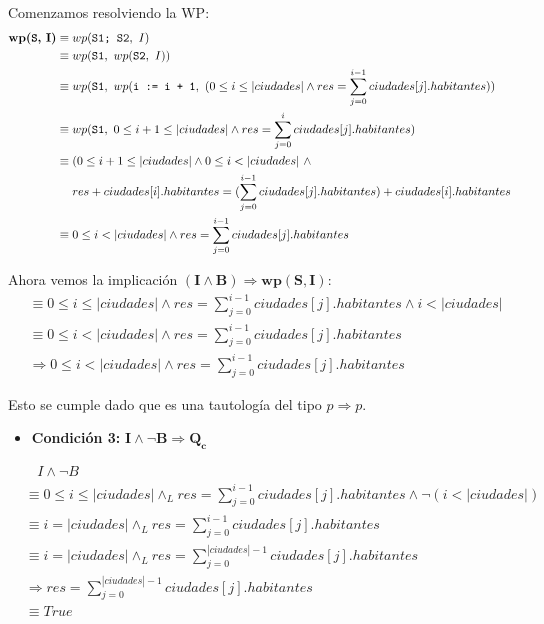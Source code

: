 \documentclass[10pt,a4paper]{article}
\begin{document}
Comenzamos resolviendo la WP:
    \setcounter{equation}{0}
        \begin{align}
                \textbf{wp(\texttt{S}, I)} &\equiv wp(\texttt{S1; S2}, \ I) \\
                &\equiv wp(\texttt{S1}, \ wp(\texttt{S2}, \ I)) \\
                &\equiv wp(\texttt{S1}, \ wp(\texttt{i := i + 1}, \ (0 \leq i \leq |ciudades| \land res = \sum\limits_{j = 0}^{i - 1} ciudades[j].habitantes)) \\
                &\equiv wp(\texttt{S1}, \ 0 \leq i + 1 \leq |ciudades| \land res = \sum\limits_{j = 0}^{i} ciudades[j].habitantes) \\
                &\equiv (0 \leq i + 1 \leq |ciudades| \land 0\leq i < |ciudades| \ \land \\
                & \ \ \ \ res + ciudades[i].habitantes = (\sum\limits_{j = 0}^{i - 1} ciudades[j].habitantes) + ciudades[i].habitantes \\
                &\equiv 0 \leq i < |ciudades| \land res = \sum\limits_{j = 0}^{i - 1} ciudades[j].habitantes
        \end{align}

Ahora vemos la implicación $\mathbf{(I\land B) \Rightarrow wp(\textbf{S},I)}$:
    \setcounter{equation}{0}
    \begin{align}
               & \equiv 0 \leq i \leq |ciudades| \land res = \sum\limits_{j = 0} ^ {i - 1} ciudades[j].habitantes \land i < |ciudades| \\
               & \equiv 0 \leq i < |ciudades| \land res = \sum\limits_{j = 0} ^ {i - 1} ciudades[j].habitantes \\
               \nonumber & \Rightarrow 0 \leq i < |ciudades| \land res =\sum\limits_{j=0} ^ {i-1} ciudades[j].habitantes 
    \end{align}

Esto se cumple dado que es una tautología del tipo $p \Rightarrow p$. \\


\begin{itemize}
    \item{\textbf{Condición 3:} $\mathbf{I \land \lnot B \Rightarrow Q_c}$}
\end{itemize}

\setcounter{equation}{0}
\begin{align}
        \nonumber & \ \ \ \ I \land \lnot B \\ 
        & \equiv 0 \leq i \leq |ciudades| \land_L res = \sum_{j = 0}^{i - 1} ciudades[j].habitantes \land \lnot (i < |ciudades|) \\
        & \equiv i = |ciudades| \land_L res = \sum_{j = 0}^{i - 1} ciudades[j].habitantes \\
        & \equiv i = |ciudades| \land_L res = \sum_{j = 0}^{|ciudades| - 1} ciudades[j].habitantes \\
        \nonumber & \Rightarrow res = \sum_{j = 0}^{|ciudades| - 1} ciudades[j].habitantes \\
        \nonumber & \equiv True
\end{align}
\end{document}
